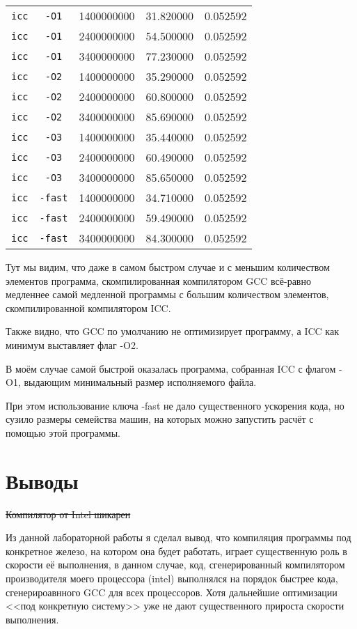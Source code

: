\documentclass[a4paper,12pt]{article}
\begin{document}
\begin{tabular}{c | c | c c c}
\hline
\texttt{icc} & \texttt{-O1} & 1400000000 & 31.820000 & 0.052592\\
\texttt{icc} & \texttt{-O1} & 2400000000 & 54.500000 & 0.052592\\
\texttt{icc} & \texttt{-O1} & 3400000000 & 77.230000 & 0.052592\\
\hline
\texttt{icc} & \texttt{-O2} & 1400000000 & 35.290000 & 0.052592\\
\texttt{icc} & \texttt{-O2} & 2400000000 & 60.800000 & 0.052592\\
\texttt{icc} & \texttt{-O2} & 3400000000 & 85.690000 & 0.052592\\
\hline
\texttt{icc} & \texttt{-O3} & 1400000000 & 35.440000 & 0.052592\\
\texttt{icc} & \texttt{-O3} & 2400000000 & 60.490000 & 0.052592\\
\texttt{icc} & \texttt{-O3} & 3400000000 & 85.650000 & 0.052592\\
\hline
\texttt{icc} & \texttt{-fast} & 1400000000 & 34.710000 & 0.052592\\
\texttt{icc} & \texttt{-fast} & 2400000000 & 59.490000 & 0.052592\\
\texttt{icc} & \texttt{-fast} & 3400000000 & 84.300000 & 0.052592\\
\hline
\end{tabular}

Тут мы видим, что даже в самом быстром случае и с меньшим количеством элементов программа, скомпилированная компилятором GCC всё-равно медленнее самой медленной программы с большим количеством элементов, скомпилированной компилятором ICC.

Также видно, что GCC по умолчанию не оптимизирует программу, а ICC как минимум выставляет флаг -O2.

В моём случае самой быстрой оказалась программа, собранная ICC с флагом -O1, выдающим минимальный размер исполняемого файла.

При этом использование ключа -fast не дало существенного ускорения кода, но сузило размеры семейства машин, на которых можно запустить расчёт с помощью этой программы.
\newpage
\section{Выводы}
\sout{Компилятор от Intel шикарен}

Из данной лабораторной работы я сделал вывод, что компиляция программы под конкретное железо, на котором она будет работать, играет существенную роль в скорости её выполнения, в данном случае, код, сгенерированный компилятором производителя моего процессора (intel) выполнялся на порядок быстрее кода, сгенерироавнного GCC для всех процессоров. Хотя дальнейшие оптимизации <<под конкретную систему>> уже не дают существенного прироста скорости выполнения.
\end{document}
